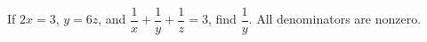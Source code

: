 If $2x=3$, $y=6z$, and $\dfrac{1}{x}+\dfrac{1}{y}+\dfrac{1}{z}=3$, find $\dfrac{1}{y}$. All denominators are nonzero.
